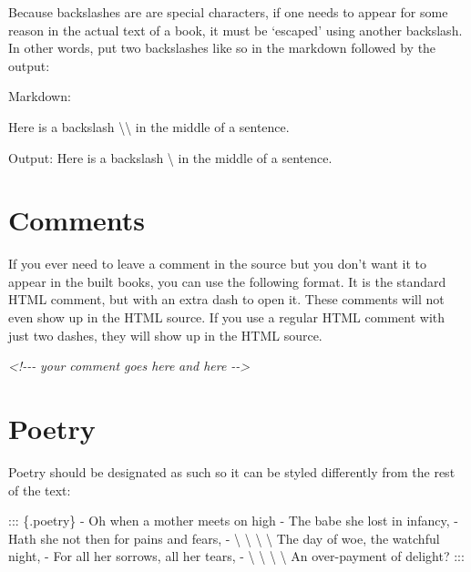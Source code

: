 \documentclass[
]{book}
\newenvironment{Shaded}{\begin{snugshade}}{\end{snugshade}}
\newcommand{\CommentTok}[1]{\textcolor[rgb]{0.56,0.35,0.01}{\textit{#1}}}
\newcommand{\NormalTok}[1]{#1}
\newcommand{\SpecialCharTok}[1]{\textcolor[rgb]{0.00,0.00,0.00}{#1}}
\newcommand{\SpecialStringTok}[1]{\textcolor[rgb]{0.31,0.60,0.02}{#1}}
\begin{document}
Because backslashes are are special characters, if one needs to appear for some reason in the actual text of a book, it must be `escaped' using another backslash. In other words, put two backslashes like so in the markdown followed by the output:

Markdown:

\begin{Shaded}
\begin{Highlighting}[]
\NormalTok{Here is a backslash }\SpecialCharTok{\textbackslash{}\textbackslash{}}\NormalTok{ in the middle of a sentence. }
\end{Highlighting}
\end{Shaded}

Output:
Here is a backslash \textbackslash{} in the middle of a sentence.

\hypertarget{comments}{%
\chapter{Comments}\label{comments}}

If you ever need to leave a comment in the source but you don't want it to appear in the built books, you can use the following format. It is the standard HTML comment, but with an extra dash to open it. These comments will not even show up in the HTML source. If you use a regular HTML comment with just two dashes, they will show up in the HTML source.

\begin{Shaded}
\begin{Highlighting}[]
\CommentTok{\textless{}!{-}{-}{-}}
\CommentTok{your comment goes here}
\CommentTok{and here}
\CommentTok{{-}{-}\textgreater{}}
\end{Highlighting}
\end{Shaded}

\hypertarget{poetry}{%
\chapter{Poetry}\label{poetry}}

Poetry should be designated as such so it can be styled differently from the rest of the text:

\begin{Shaded}
\begin{Highlighting}[]
\NormalTok{::: \{.poetry\}}
\SpecialStringTok{{-} }\NormalTok{Oh when a mother meets on high}
\SpecialStringTok{{-} }\NormalTok{The babe she lost in infancy,}
\SpecialStringTok{{-} }\NormalTok{Hath she not then for pains and fears,}
\SpecialStringTok{{-} }\NormalTok{\textbackslash{} \textbackslash{} \textbackslash{} \textbackslash{} The day of woe, the watchful night,}
\SpecialStringTok{{-} }\NormalTok{For all her sorrows, all her tears,}
\SpecialStringTok{{-} }\NormalTok{\textbackslash{} \textbackslash{} \textbackslash{} \textbackslash{} An over{-}payment of delight?}
\NormalTok{:::}
\end{Highlighting}
\end{Shaded}
\end{document}
